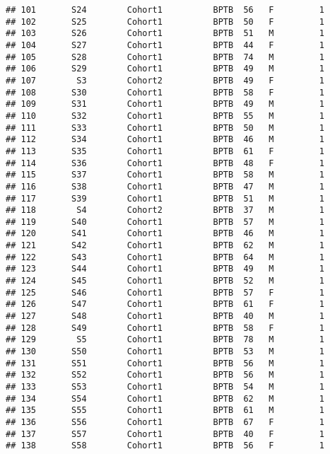 \documentclass[
]{article}
\begin{document}
\begin{verbatim}
## 101       S24        Cohort1          BPTB  56   F         1      
## 102       S25        Cohort1          BPTB  50   F         1      
## 103       S26        Cohort1          BPTB  51   M         1      
## 104       S27        Cohort1          BPTB  44   F         1      
## 105       S28        Cohort1          BPTB  74   M         1      
## 106       S29        Cohort1          BPTB  49   M         1      
## 107        S3        Cohort2          BPTB  49   F         1      
## 108       S30        Cohort1          BPTB  58   F         1      
## 109       S31        Cohort1          BPTB  49   M         1      
## 110       S32        Cohort1          BPTB  55   M         1      
## 111       S33        Cohort1          BPTB  50   M         1      
## 112       S34        Cohort1          BPTB  46   M         1      
## 113       S35        Cohort1          BPTB  61   F         1      
## 114       S36        Cohort1          BPTB  48   F         1      
## 115       S37        Cohort1          BPTB  58   M         1      
## 116       S38        Cohort1          BPTB  47   M         1      
## 117       S39        Cohort1          BPTB  51   M         1      
## 118        S4        Cohort2          BPTB  37   M         1      
## 119       S40        Cohort1          BPTB  57   M         1      
## 120       S41        Cohort1          BPTB  46   M         1      
## 121       S42        Cohort1          BPTB  62   M         1      
## 122       S43        Cohort1          BPTB  64   M         1      
## 123       S44        Cohort1          BPTB  49   M         1      
## 124       S45        Cohort1          BPTB  52   M         1      
## 125       S46        Cohort1          BPTB  57   F         1      
## 126       S47        Cohort1          BPTB  61   F         1      
## 127       S48        Cohort1          BPTB  40   M         1      
## 128       S49        Cohort1          BPTB  58   F         1      
## 129        S5        Cohort1          BPTB  78   M         1      
## 130       S50        Cohort1          BPTB  53   M         1      
## 131       S51        Cohort1          BPTB  56   M         1      
## 132       S52        Cohort1          BPTB  56   M         1      
## 133       S53        Cohort1          BPTB  54   M         1      
## 134       S54        Cohort1          BPTB  62   M         1      
## 135       S55        Cohort1          BPTB  61   M         1      
## 136       S56        Cohort1          BPTB  67   F         1      
## 137       S57        Cohort1          BPTB  40   F         1      
## 138       S58        Cohort1          BPTB  56   F         1      

\end{verbatim}
\end{document}
